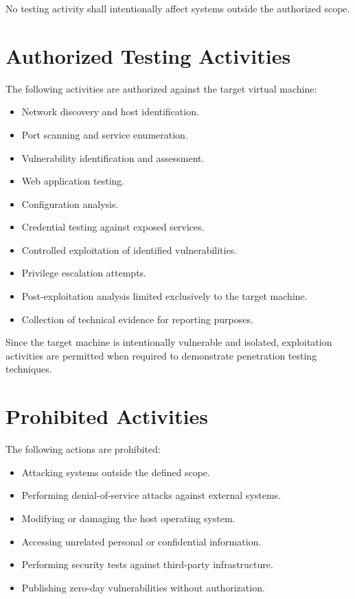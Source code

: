 No testing activity shall intentionally affect systems outside the authorized
scope.


\section{Authorized Testing Activities}

The following activities are authorized against the target virtual machine:

\begin{itemize}
    \item Network discovery and host identification.
    \item Port scanning and service enumeration.
    \item Vulnerability identification and assessment.
    \item Web application testing.
    \item Configuration analysis.
    \item Credential testing against exposed services.
    \item Controlled exploitation of identified vulnerabilities.
    \item Privilege escalation attempts.
    \item Post-exploitation analysis limited exclusively to the target machine.
    \item Collection of technical evidence for reporting purposes.
\end{itemize}

Since the target machine is intentionally vulnerable and isolated, exploitation
activities are permitted when required to demonstrate penetration testing
techniques.


\section{Prohibited Activities}

The following actions are prohibited:

\begin{itemize}
    \item Attacking systems outside the defined scope.
    \item Performing denial-of-service attacks against external systems.
    \item Modifying or damaging the host operating system.
    \item Accessing unrelated personal or confidential information.
    \item Performing security tests against third-party infrastructure.
    \item Publishing zero-day vulnerabilities without authorization.
\end{itemize}


